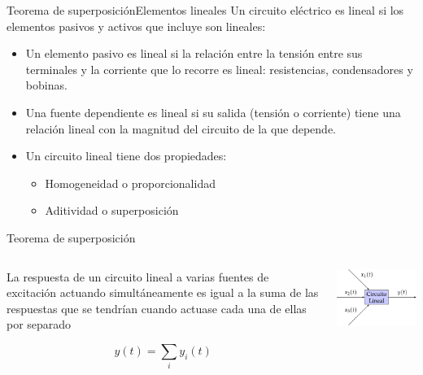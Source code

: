 \documentclass[aspectratio=169, xcolor={usenames,svgnames,dvipsnames}]{beamer}
\begin{document}
\begin{frame}{Teorema de superposición}{Elementos lineales}
Un circuito eléctrico es lineal si los elementos pasivos y activos que incluye son lineales:
\begin{itemize}
\item Un \alert{elemento pasivo} es lineal si la relación entre la tensión entre sus terminales y la corriente que lo recorre es lineal: \alert{resistencias, condensadores y bobinas}.
\item Una \alert{fuente dependiente} es lineal si su salida (tensión o corriente) tiene una relación lineal con la magnitud del circuito de la que depende.
\item Un circuito lineal tiene dos propiedades:
\begin{itemize}
\item Homogeneidad o \alert{proporcionalidad}
\item Aditividad o \alert{superposición}
\end{itemize}
\end{itemize}
\end{frame}

\begin{frame}{Teorema de superposición}%
\begin{columns}
\begin{column}{0.5\columnwidth}
La respuesta de un \alert{circuito lineal} a varias fuentes de excitación actuando simultáneamente es igual a la suma de las respuestas que se tendrían cuando actuase cada una de ellas por separado

\[
y(t) = \sum_i y_i(t)
\]
\end{column}

\begin{column}{0.5\columnwidth}
\begin{center}
\includegraphics[width=\linewidth]{../figs/superposicion.pdf}
\end{center}
\end{column}
\end{columns}
\end{frame}
\end{document}
